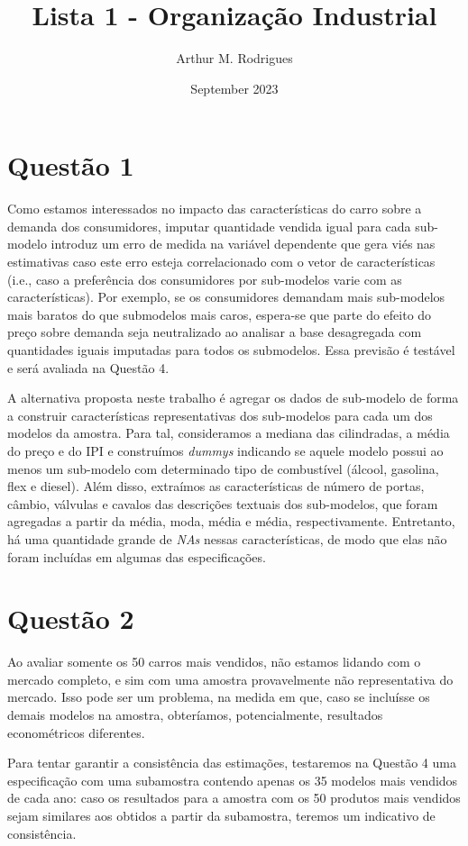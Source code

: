 \documentclass{article}
\title{Lista 1 - Organização Industrial}
\author{Arthur M. Rodrigues}
\date{September 2023}
\begin{document}
\maketitle

\section*{Questão 1}

Como estamos interessados no impacto das características do carro sobre a demanda dos consumidores, imputar quantidade vendida igual para cada sub-modelo introduz um erro de medida na variável dependente que gera viés nas estimativas caso este erro esteja correlacionado com o vetor de características (i.e., caso a preferência dos consumidores por sub-modelos varie com as características). Por exemplo, se os consumidores demandam mais sub-modelos mais baratos do que submodelos mais caros, espera-se que parte do efeito do preço sobre demanda seja neutralizado ao analisar a base desagregada com quantidades iguais imputadas para todos os submodelos. Essa previsão é testável e será avaliada na Questão 4.

A alternativa proposta neste trabalho é agregar os dados de sub-modelo de forma a construir características representativas dos sub-modelos para cada um dos modelos da amostra. Para tal, consideramos a mediana das cilindradas, a média do preço e do IPI e construímos \emph{dummys} indicando se aquele modelo possui ao menos um sub-modelo com determinado tipo de combustível (álcool, gasolina, flex e diesel). Além disso, extraímos as características de número de portas, câmbio, válvulas e cavalos das descrições textuais dos sub-modelos, que foram agregadas a partir da média, moda, média e média, respectivamente. Entretanto, há uma quantidade grande de \emph{NAs} nessas características, de modo que elas não foram incluídas em algumas das especificações.

\section*{Questão 2}

Ao avaliar somente os 50 carros mais vendidos, não estamos lidando com o mercado completo, e sim com uma amostra provavelmente não representativa do mercado. Isso pode ser um problema, na medida em que, caso se incluísse os demais modelos na amostra, obteríamos, potencialmente, resultados econométricos diferentes.

Para tentar garantir a consistência das estimações, testaremos na Questão 4 uma especificação com uma subamostra contendo apenas os 35 modelos mais vendidos de cada ano: caso os resultados para a amostra com os 50 produtos mais vendidos sejam similares aos obtidos a partir da subamostra, teremos um indicativo de consistência. 
\end{document}
